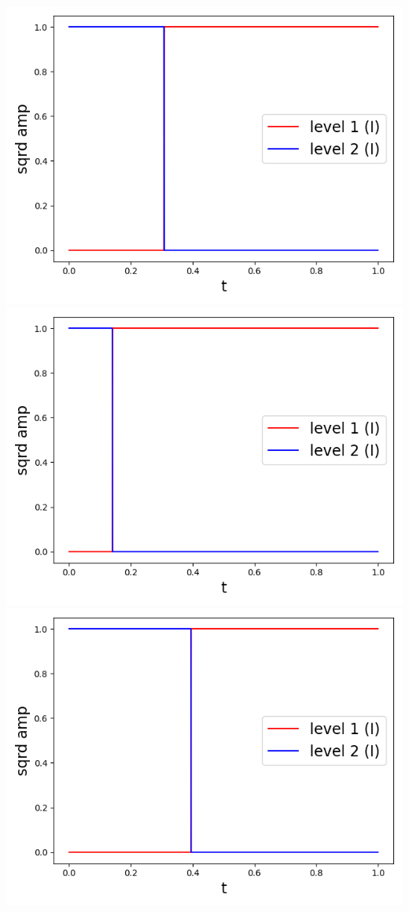 \documentclass[11pt, oneside]{book}
\theoremstyle{break}
\theoremstyle{break}
\begin{document}
\begin{center}
\includegraphics[scale=0.39]{542HW2/I/1I_single.png}\qquad
\includegraphics[scale=0.39]{542HW2/I/2I_single.png}\qquad
\includegraphics[scale=0.39]{542HW2/I/3I_single.png}\qquad

\end{center}
\end{document}
